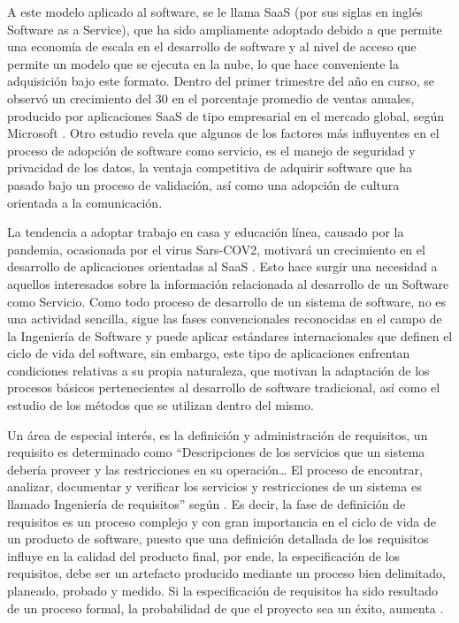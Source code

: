 \documentclass{article}
\begin{document}
A este modelo aplicado al software, se le llama SaaS (por sus siglas en inglés Software as a Service), que ha sido ampliamente adoptado debido a que permite una economía de escala en el desarrollo de software y al nivel 
de acceso que permite un modelo que se ejecuta en la nube, lo que hace conveniente la adquisición bajo este formato. Dentro del primer trimestre del año en curso, se observó un crecimiento del 30%
en el porcentaje promedio de ventas anuales, producido por aplicaciones SaaS de tipo empresarial en el mercado global, según Microsoft \cite{antecedentes7}. Otro estudio revela que algunos de los factores más influyentes en el 
proceso de adopción de software como servicio, es el manejo de seguridad y privacidad de los datos, la ventaja competitiva de adquirir software que ha pasado bajo un proceso de validación, así como una adopción de cultura orientada a la comunicación.

La tendencia a adoptar trabajo en casa y educación línea, causado por la pandemia, ocasionada por el virus Sars-COV2, motivará un crecimiento en el desarrollo de aplicaciones orientadas al SaaS \cite{antecedentes5}. Esto hace 
surgir una necesidad a aquellos interesados sobre la información relacionada al desarrollo de un Software como Servicio.
Como todo proceso de desarrollo de un sistema de software, no es una actividad sencilla, sigue las fases convencionales reconocidas en el campo de la Ingeniería de Software y puede aplicar estándares internacionales 
que definen el ciclo de vida del software, sin embargo, este tipo de aplicaciones enfrentan condiciones relativas a su propia naturaleza, que motivan la adaptación de los procesos básicos pertenecientes al desarrollo de software 
tradicional, así como el estudio de los métodos que se utilizan dentro del mismo.

Un área de especial interés, es la definición y administración de requisitos, un requisito es determinado como “Descripciones de los servicios que un sistema debería proveer y las restricciones en su operación… El proceso de encontrar, analizar, 
documentar y verificar los servicios y restricciones de un sistema es llamado Ingeniería de requisitos” según \cite{antecedentes8}. Es decir, la fase de definición de requisitos es un proceso complejo y con gran importancia en el ciclo 
de vida de un producto de software, puesto que una definición detallada de los requisitos influye en la calidad del producto final, por ende, la especificación de los requisitos, debe ser un artefacto producido mediante un 
proceso bien delimitado, planeado, probado y medido. Si la especificación de requisitos ha sido resultado de un proceso formal, la probabilidad de que el proyecto sea un éxito, aumenta \cite{antecedentes}.
\end{document}
